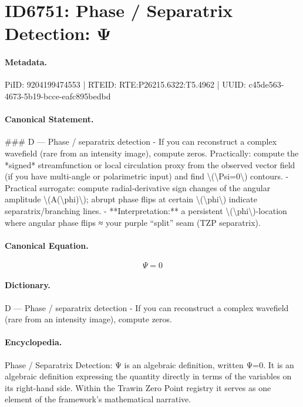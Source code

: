 \section*{ID6751: Phase / Separatrix Detection: Ψ}
\paragraph{Metadata.}
PiID: 9204199474553 | RTEID: RTE:P26215.6322:T5.4962 | UUID: c45de563-4673-5b19-bcce-eafc895bedbd

\paragraph{Canonical Statement.}
\#\#\# D — Phase / separatrix detection - If you can reconstruct a complex wavefield (rare from an intensity image), compute zeros. Practically: compute the *signed* streamfunction or local circulation proxy from the observed vector field (if you have multi-angle or polarimetric input) and find \textbackslash{}(\textbackslash{}Psi=0\textbackslash{}) contours. - Practical surrogate: compute radial-derivative sign changes of the angular amplitude \textbackslash{}(A(\textbackslash{}phi)\textbackslash{}); abrupt phase flips at certain \textbackslash{}(\textbackslash{}phi\textbackslash{}) indicate separatrix/branching lines. - **Interpretation:** a persistent \textbackslash{}(\textbackslash{}phi\textbackslash{})-location where angular phase flips ≈ your purple “split” seam (TZP separatrix).

\paragraph{Canonical Equation.}
\[
\Psi=0
\]

\paragraph{Dictionary.}
D — Phase / separatrix detection - If you can reconstruct a complex wavefield (rare from an intensity image), compute zeros.

\paragraph{Encyclopedia.}
Phase / Separatrix Detection: Ψ is an algebraic definition, written Ψ=0. It is an algebraic definition expressing the quantity directly in terms of the variables on its right-hand side. Within the Trawin Zero Point registry it serves as one element of the framework's mathematical narrative.
